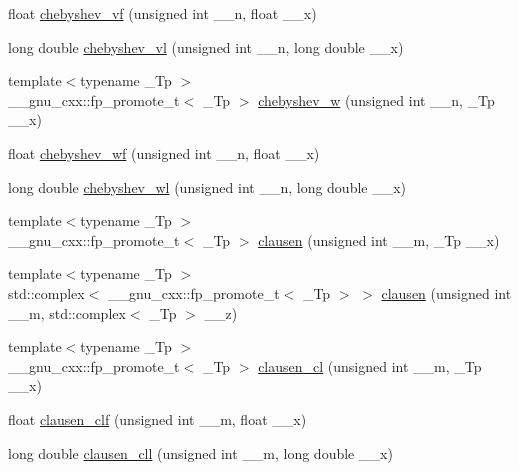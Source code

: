 \begin{DoxyCompactItemize}
\item 
float \hyperlink{group__gnu__math__spec__func_gaa9635a0da4bdeaa8060ae5cf03c3a12d}{chebyshev\+\_\+vf} (unsigned int \+\_\+\+\_\+n, float \+\_\+\+\_\+x)
\item 
long double \hyperlink{group__gnu__math__spec__func_gae387ee1bfcd52555ad4d690f5888a078}{chebyshev\+\_\+vl} (unsigned int \+\_\+\+\_\+n, long double \+\_\+\+\_\+x)
\item 
{\footnotesize template$<$typename \+\_\+\+Tp $>$ }\\\+\_\+\+\_\+gnu\+\_\+cxx\+::fp\+\_\+promote\+\_\+t$<$ \+\_\+\+Tp $>$ \hyperlink{group__gnu__math__spec__func_gaa156c6c21e99104ebcb627e92aceada0}{chebyshev\+\_\+w} (unsigned int \+\_\+\+\_\+n, \+\_\+\+Tp \+\_\+\+\_\+x)
\item 
float \hyperlink{group__gnu__math__spec__func_gae6d468cee53df584e40afe294127b090}{chebyshev\+\_\+wf} (unsigned int \+\_\+\+\_\+n, float \+\_\+\+\_\+x)
\item 
long double \hyperlink{group__gnu__math__spec__func_ga1297dfd9b9a0f584435de7d83eb9e9c3}{chebyshev\+\_\+wl} (unsigned int \+\_\+\+\_\+n, long double \+\_\+\+\_\+x)
\item 
{\footnotesize template$<$typename \+\_\+\+Tp $>$ }\\\+\_\+\+\_\+gnu\+\_\+cxx\+::fp\+\_\+promote\+\_\+t$<$ \+\_\+\+Tp $>$ \hyperlink{group__gnu__math__spec__func_ga54e4ba71b1f81718d6998349f91ff88f}{clausen} (unsigned int \+\_\+\+\_\+m, \+\_\+\+Tp \+\_\+\+\_\+x)
\item 
{\footnotesize template$<$typename \+\_\+\+Tp $>$ }\\std\+::complex$<$ \+\_\+\+\_\+gnu\+\_\+cxx\+::fp\+\_\+promote\+\_\+t$<$ \+\_\+\+Tp $>$ $>$ \hyperlink{group__gnu__math__spec__func_gaf7c4317ef6bfd3a4bf0ddcba22ee7588}{clausen} (unsigned int \+\_\+\+\_\+m, std\+::complex$<$ \+\_\+\+Tp $>$ \+\_\+\+\_\+z)
\item 
{\footnotesize template$<$typename \+\_\+\+Tp $>$ }\\\+\_\+\+\_\+gnu\+\_\+cxx\+::fp\+\_\+promote\+\_\+t$<$ \+\_\+\+Tp $>$ \hyperlink{group__gnu__math__spec__func_ga8786b86db309998f93f877cfb9bdfd57}{clausen\+\_\+cl} (unsigned int \+\_\+\+\_\+m, \+\_\+\+Tp \+\_\+\+\_\+x)
\item 
float \hyperlink{group__gnu__math__spec__func_ga5e1bf6c24eb4359ffacb49da62f0838b}{clausen\+\_\+clf} (unsigned int \+\_\+\+\_\+m, float \+\_\+\+\_\+x)
\item 
long double \hyperlink{group__gnu__math__spec__func_gab06f3c94f96538167147f028711903a9}{clausen\+\_\+cll} (unsigned int \+\_\+\+\_\+m, long double \+\_\+\+\_\+x)

\end{DoxyCompactItemize}
